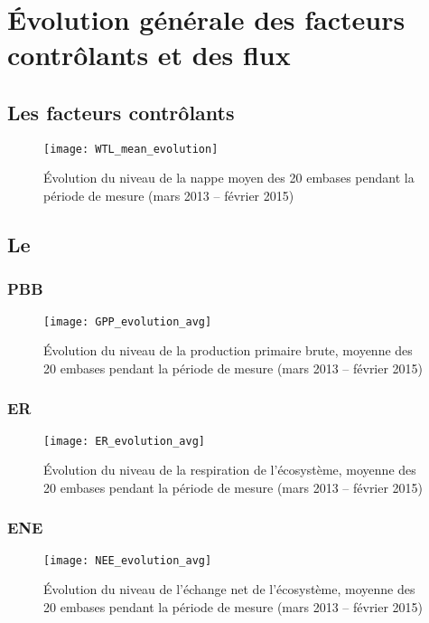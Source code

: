 \section{Évolution générale des facteurs contrôlants et des flux}

\subsection{Les facteurs contrôlants}

\begin{figure}
\centering
\texttt{[image: WTL\_mean\_evolution]}
\caption{Évolution du niveau de la nappe moyen des 20 embases pendant la période de mesure (mars 2013 -- février 2015)}
\label{fig:WTL_mean_evolution}
\end{figure}

\subsection{Le \coo}

\subsubsection{PBB}

\begin{figure}
\centering
\texttt{[image: GPP\_evolution\_avg]}
\caption{Évolution du niveau de la production primaire brute, moyenne des 20 embases pendant la période de mesure (mars 2013 -- février 2015)}
\label{fig:GPP_evolution_avg}
\end{figure}

\subsubsection{ER}

\begin{figure}
\centering
\texttt{[image: ER\_evolution\_avg]}
\caption{Évolution du niveau de la respiration de l'écosystème, moyenne des 20 embases pendant la période de mesure (mars 2013 -- février 2015)}
\label{fig:ER_evolution_avg}
\end{figure}

\subsubsection{ENE}

\begin{figure}
\centering
\texttt{[image: NEE\_evolution\_avg]}
\caption{Évolution du niveau de l'échange net de l'écosystème, moyenne des 20 embases pendant la période de mesure (mars 2013 -- février 2015)}
\label{fig:NEE_evolution_avg}
\end{figure}

